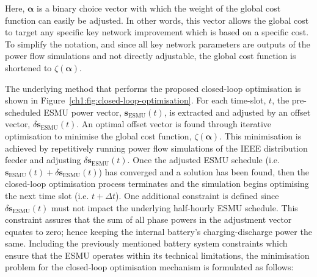 

Here, $\boldsymbol{\alpha}$ is a binary choice vector with which the weight of the global cost function can easily be adjusted.
In other words, this vector allows the global cost to target any specific key network improvement which is based on a specific cost.
To simplify the notation, and since all key network parameters are outputs of the power flow simulations and not directly adjustable, the global cost function is shortened to $\zeta(\boldsymbol{\alpha})$.




The underlying method that performs the proposed closed-loop optimisation is shown in Figure~\ref{ch1:fig:closed-loop-optimisation}.
For each time-slot, $t$, the pre-scheduled ESMU power vector, $\textbf{s}_\text{ESMU}(t)$, is extracted and adjusted by an offset vector, $\delta \textbf{s}_\text{ESMU}(t)$.
An optimal offset vector is found through iterative optimisation to minimise the global cost function, $\zeta(\boldsymbol{\alpha})$.
This minimisation is achieved by repetitively running power flow simulations of the IEEE distribution feeder and adjusting $\delta\textbf{s}_\text{ESMU}(t)$.
Once the adjusted ESMU schedule (i.e. $\textbf{s}_\text{ESMU}(t) + \delta \textbf{s}_\text{ESMU}(t)$) has converged and a solution has been found, then the closed-loop optimisation process terminates and the simulation begins optimising the next time slot (i.e. $t+\Delta t$).
One additional constraint is defined since $\delta \textbf{s}_\text{ESMU}(t)$ must not impact the underlying half-hourly ESMU schedule.
This constraint assures that the sum of all phase powers in the adjustment vector equates to zero; hence keeping the internal battery's charging-discharge power the same.
Including the previously mentioned battery system constraints which ensure that the ESMU operates within its technical limitations, the minimisation problem for the closed-loop optimisation mechanism is formulated as follows:

